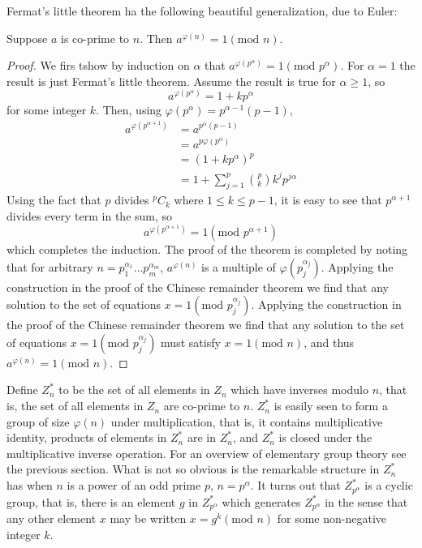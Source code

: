 Fermat's little theorem ha the following beautiful generalization, due to Euler:
\begin{theorem}
    Suppose $a$ is co-prime to $n$. Then $a^{\varphi(n)}=1 (\text{mod }n)$.
\end{theorem}
\begin{proof}
    We firs tshow by induction on $\alpha$ that $a^{\varphi(p^{\alpha})} = 1 (\text{mod }p^{\alpha})$. For $\alpha=1$ the result is just Fermat's little theorem. Assume the result is true for $\alpha \geq 1$, so
    \[
    a^{\varphi(p^{\alpha})} = 1 +kp^{\alpha}
    \]
    for some integer $k$. Then, using $\varphi(p^{\alpha}) = p^{\alpha-1}(p-1)$,
    \begin{align*}
        a^{\varphi(p^{\alpha+1})} &= a^{p^{\alpha}(p-1)}\\
        &=a^{p\varphi(p^{\alpha})}\\
        &=(1+kp^{\alpha})^p\\
        &=1+\sum_{j=1}^p \binom{p}{k} k^j p^{j\alpha}
    \end{align*}
    Using the fact that $p$ divides $^pC_k$ where $1\leq k \leq p-1$, it is easy to see that $p^{\alpha+1}$ divides every term in the sum, so
    \[
    a^{\varphi(p^{\alpha+1})} =1 (\text{mod }p^{\alpha+1})
    \]
    which completes the induction. The proof of the theorem is completed by noting that for arbitrary $n = p_1^{\alpha_1}\ldots p_m^{\alpha_m}$, $a^{\varphi(n)}$ is a multiple of $\varphi(p_j^{\alpha_j})$. Applying the construction in the proof of the Chinese remainder theorem we find that any solution to the set of equations $x=1(\text{mod }p_j^{\alpha_j})$. Applying the construction in the proof of the Chinese remainder theorem we find that any solution to the set of equations $x = 1 (\text{mod }p_j^{\alpha_j})$ must satisfy $x=1(\text{mod }n)$, and thus $a^{\varphi(n)}=1(\text{mod }n)$.
\end{proof}

Define $Z_n^*$ to be the set of all elements in $Z_n$ which have inverses modulo $n$, that is, the set of all elements in $Z_n$ are co-prime to $n$. $Z_n^*$ is easily seen to form a group of size $\varphi(n)$ under multiplication, that is, it contains multiplicative identity, products of elements in $Z_n^*$ are in $Z_n^*$, and $Z_n^*$ is closed under the multiplicative inverse operation. For an overview of elementary group theory see the previous section. What is not so obvious is the remarkable structure in $Z_n^*$ has when $n$ is a power of an odd prime $p$, $n=p^{\alpha}$. It turns out that $Z_{p^{\alpha}}^*$ is a cyclic group, that is, there is an element $g$ in $Z_{p^{\alpha}}^*$ which generates $Z_{p^{\alpha}}^*$ in the sense that any other element $x$ may be written $x=g^k (\text{mod } n)$ for some non-negative integer $k$.


